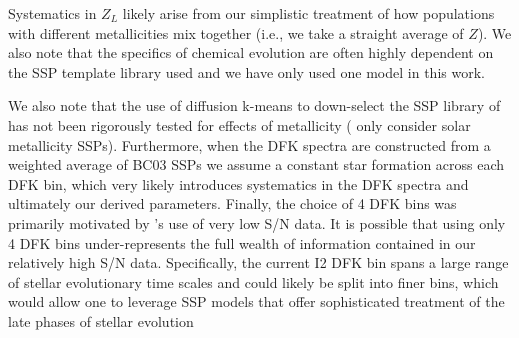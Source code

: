 Systematics in $Z_L$ likely arise from our simplistic treatment of how
populations with different metallicities mix together (i.e., we take a
straight average of $Z$). We also note that the specifics of chemical
evolution are often highly dependent on the SSP template library used
and we have only used one model  in this work.


We also note that the use of diffusion k-means to down-select the SSP
library of \citet{Bruzual03} has not been rigorously tested for
effects of metallicity ( only consider solar
metallicity SSPs). Furthermore, when the DFK spectra are constructed
from a weighted average of BC03 SSPs we assume a constant star
formation across each DFK bin, which very likely introduces
systematics in the DFK spectra and ultimately our derived
parameters. Finally, the choice of 4 DFK bins was primarily motivated
by 's use of very low S/N data. It is possible
that using only 4 DFK bins under-represents the full wealth of
information contained in our relatively high S/N data. Specifically,
the current I2 DFK bin spans a large range of stellar evolutionary
time scales and could likely be split into finer bins, which would
allow one to leverage SSP models that offer sophisticated treatment of
the late phases of stellar evolution 



